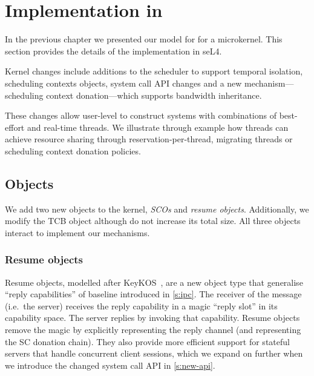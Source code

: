 \chapter{Implementation in \selfour}
\label{chap:implementation}


In the previous chapter we presented our model for  for a microkernel.
This section provides the details of the implementation in seL4.


Kernel changes include additions to the scheduler to support temporal isolation, scheduling contexts
objects, system call API changes and a new mechanism---scheduling context donation---which supports bandwidth inheritance.

These changes allow user-level to construct systems with combinations of best-effort and real-time threads.
We illustrate through example how threads can achieve resource sharing through reservation-per-thread, migrating threads or scheduling context donation policies.



\section{Objects}

We add two new objects to the kernel, \emph{\glspl{SCO}} and \emph{resume objects}. Additionally, we modify
the \gls{TCB} object although do not increase its total size. All three objects interact to
implement our mechanisms.

\subsection{Resume objects}
\label{s:resume}

Resume objects, modelled after KeyKOS~\citep{Bomberger_FFHLS_92}, are
a new object type that generalise
``reply capabilities'' of baseline \selfour introduced in \cref{s:ipc}.
The receiver of the message (i.e.\ the
server) receives the reply capability in a magic ``reply slot'' in its
capability space. The server replies by invoking that
capability. Resume objects remove the magic by explicitly representing
the reply channel (and representing the SC donation chain). They also
provide more efficient support for stateful servers that handle
concurrent client sessions, which we expand on further when we introduce the changed system call \gls{API} in \cref{s:new-api}.

